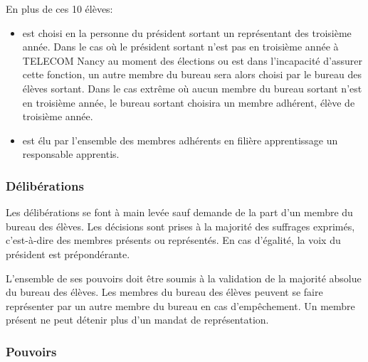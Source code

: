 \documentclass{article}
\begin{document}
				En plus de ces 10 élèves:
				\begin{itemize}
					\item est choisi en la personne du président sortant un
						représentant des troisième année. Dans le cas où le
						président sortant n’est pas en troisième année à TELECOM
						Nancy au moment des élections ou est dans l'incapacité
						d'assurer cette fonction, un autre membre du bureau sera
						alors choisi par le bureau des élèves sortant. Dans le
						cas extrême où aucun membre du bureau sortant n’est en
						troisième année, le bureau sortant choisira un membre
						adhérent, élève de troisième année.
					\item est élu par l’ensemble des membres adhérents en
						filière apprentissage un responsable apprentis.
				\end{itemize}

			\subsubsection{Délibérations}
\label{ssub:deliberations}
			
				Les délibérations se font à main levée sauf demande de la part
				d’un membre du bureau des élèves. Les décisions sont prises à la
				majorité des suffrages exprimés, c’est-à-dire des membres
				présents ou représentés. En cas d'égalité, la voix du président
				est prépondérante.

				L’ensemble de ses pouvoirs doit être soumis à la validation de
				la majorité absolue du bureau des élèves. Les membres du bureau
				des élèves peuvent se faire représenter par un autre membre du
				bureau en cas d’empêchement. Un membre présent ne peut détenir
				plus d’un mandat de représentation.

			\subsubsection{Pouvoirs}
\label{ssub:pouvoirs}
			
\end{document}
